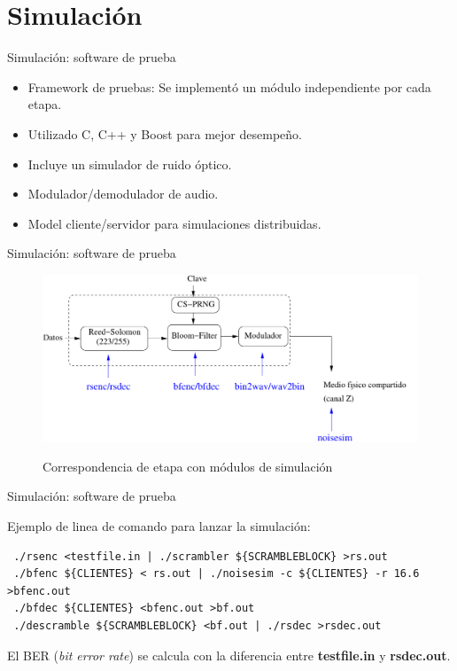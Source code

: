 \documentclass[aspectratio=169]{beamer}
\begin{document}
\section{Simulación}

\begin{frame}{Simulación: software de prueba}


  \begin{itemize}
  \item Framework de pruebas: Se implementó un módulo independiente por cada etapa.
  \item Utilizado C, C++ y Boost para mejor desempeño.
  \item Incluye un simulador de ruido óptico.
  \item Modulador/demodulador de audio.
  \item Model cliente/servidor para simulaciones distribuidas.
  \end{itemize}


\end{frame}

\begin{frame}{Simulación: software de prueba}

  \begin{figure}[t]
    \includegraphics[width=0.90 \textwidth]{../graphs/Soft-stack-sim} 
    
    Correspondencia de etapa con módulos de simulación
\end{figure}


\end{frame}

\begin{frame}[fragile]{Simulación: software de prueba}

Ejemplo de linea de comando para lanzar la simulación:

\small
\begin{verbatim}
 ./rsenc <testfile.in | ./scrambler ${SCRAMBLEBLOCK} >rs.out
 ./bfenc ${CLIENTES} < rs.out | ./noisesim -c ${CLIENTES} -r 16.6 >bfenc.out
 ./bfdec ${CLIENTES} <bfenc.out >bf.out
 ./descramble ${SCRAMBLEBLOCK} <bf.out | ./rsdec >rsdec.out
\end{verbatim}
\normalsize

El BER (\textit{bit error rate}) se calcula con la diferencia entre \textbf{testfile.in} y \textbf{rsdec.out}.
\end{frame}
\end{document}
